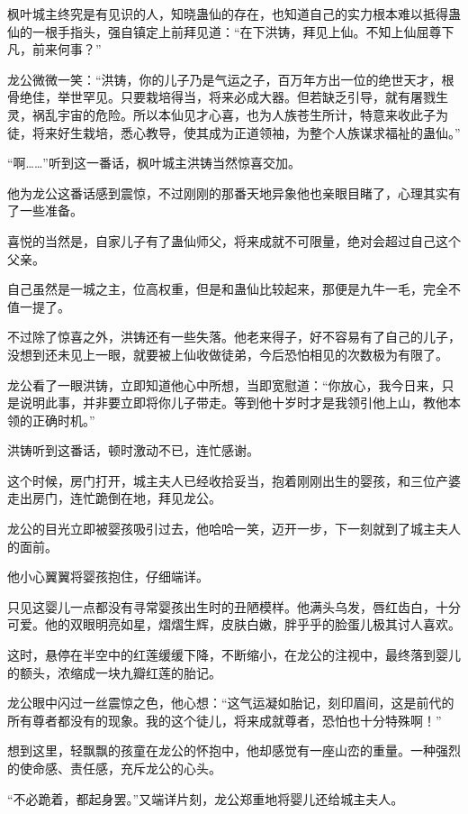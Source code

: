 \begin{this_body}
枫叶城主终究是有见识的人，知晓蛊仙的存在，也知道自己的实力根本难以抵得蛊仙的一根手指头，强自镇定上前拜见道：“在下洪铸，拜见上仙。不知上仙屈尊下凡，前来何事？”

龙公微微一笑：“洪铸，你的儿子乃是气运之子，百万年方出一位的绝世天才，根骨绝佳，举世罕见。只要栽培得当，将来必成大器。但若缺乏引导，就有屠戮生灵，祸乱宇宙的危险。所以本仙见才心喜，也为人族苍生所计，特意来收此子为徒，将来好生栽培，悉心教导，使其成为正道领袖，为整个人族谋求福祉的蛊仙。”

“啊……”听到这一番话，枫叶城主洪铸当然惊喜交加。

他为龙公这番话感到震惊，不过刚刚的那番天地异象他也亲眼目睹了，心理其实有了一些准备。

喜悦的当然是，自家儿子有了蛊仙师父，将来成就不可限量，绝对会超过自己这个父亲。

自己虽然是一城之主，位高权重，但是和蛊仙比较起来，那便是九牛一毛，完全不值一提了。

不过除了惊喜之外，洪铸还有一些失落。他老来得子，好不容易有了自己的儿子，没想到还未见上一眼，就要被上仙收做徒弟，今后恐怕相见的次数极为有限了。

龙公看了一眼洪铸，立即知道他心中所想，当即宽慰道：“你放心，我今日来，只是说明此事，并非要立即将你儿子带走。等到他十岁时才是我领引他上山，教他本领的正确时机。”

洪铸听到这番话，顿时激动不已，连忙感谢。

这个时候，房门打开，城主夫人已经收拾妥当，抱着刚刚出生的婴孩，和三位产婆走出房门，连忙跪倒在地，拜见龙公。

龙公的目光立即被婴孩吸引过去，他哈哈一笑，迈开一步，下一刻就到了城主夫人的面前。

他小心翼翼将婴孩抱住，仔细端详。

只见这婴儿一点都没有寻常婴孩出生时的丑陋模样。他满头乌发，唇红齿白，十分可爱。他的双眼明亮如星，熠熠生辉，皮肤白嫩，胖乎乎的脸蛋儿极其讨人喜欢。

这时，悬停在半空中的红莲缓缓下降，不断缩小，在龙公的注视中，最终落到婴儿的额头，浓缩成一块九瓣红莲的胎记。

龙公眼中闪过一丝震惊之色，他心想：“这气运凝如胎记，刻印眉间，这是前代的所有尊者都没有的现象。我的这个徒儿，将来成就尊者，恐怕也十分特殊啊！”

想到这里，轻飘飘的孩童在龙公的怀抱中，他却感觉有一座山峦的重量。一种强烈的使命感、责任感，充斥龙公的心头。

“不必跪着，都起身罢。”又端详片刻，龙公郑重地将婴儿还给城主夫人。


\end{this_body}

